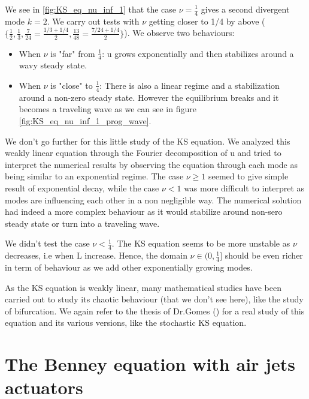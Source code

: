 \documentclass[12pt]{article}
\begin{document}
We see in \eqref{fig:KS_eq_nu_inf_1} that the case $\nu=\frac{1}{4}$ gives a second divergent mode $k=2$. We carry out tests with $\nu$ getting closer to 1/4 by above 
($\{\frac{1}{2}, \frac{1}{3}, \frac{7}{24} = \frac{1/3+1/4}{2}, \frac{13}{48} = \frac{7/24 + 1/4}{2}\}$). We observe two behaviours:
\begin{itemize}
    \item When $\nu$ is "far" from $\frac{1}{4}$: u grows exponentially and then stabilizes around a wavy steady state.
    \item When $\nu$ is "close" to $\frac{1}{4}$: There is also a linear regime and a stabilization around a non-zero steady state. 
    However the equilibrium breaks and it becomes a traveling wave as we can see in figure \ref{fig:KS_eq_nu_inf_1_prog_wave}.
\end{itemize}


We don't go further for this little study of the KS equation. We analyzed this weakly linear equation through the Fourier decomposition of u and tried to
 interpret the numerical results by observing the equation through each mode as being similar to an exponential regime. The case $\nu \geq1$ seemed to give simple result 
 of exponential decay, while the case $\nu <1$ was more difficult to interpret as modes are influencing each other in a non negligible way. The numerical solution had indeed 
 a more complex behaviour as it would stabilize around non-sero steady state or turn into a traveling wave.

We didn't test the case $\nu <\frac{1}{4}$. The KS equation seems to be more unstable as $\nu$ decreases, i.e when L increase. Hence, the domain $\nu \in (0,\frac{1}{4}] $ 
should be even richer in term of behaviour as we add other exponentially growing modes.

As the KS equation is weakly linear, many mathematical studies have been carried out to study its chaotic behaviour (that we don't see here), like the study of bifurcation.
 We again refer to the thesis of Dr.Gomes (\cite{Susana_thesis}) for a real study of this equation and its various versions, like the stochastic KS equation.




\newpage




\section{The Benney equation with air jets actuators}\label{Section_Benney_eq}
\end{document}
